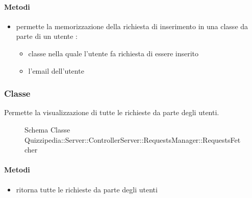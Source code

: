 \paragraph{Metodi}
\begin{itemize}
\item {}
\newline
permette la memorizzazione della richiesta di inserimento in una classe da parte di un utente
\newline
{} :
\begin{itemize}
\item {}
\newline
classe nella quale l'utente fa richiesta di essere inserito
\item {}
\newline
l'email dell'utente
\end{itemize}
\end{itemize}
\subsubsection{Classe }
Permette la visualizzazione di tutte le richieste da parte degli utenti.
\begin{figure}[H]
\centering
\noindent{}
\caption[Schema Classe RequestsFetcher]{Schema Classe Quizzipedia::Server::ControllerServer::RequestsManager::RequestsFetcher}
\end{figure}
\paragraph{Metodi}
\begin{itemize}
\item {}
\newline
ritorna tutte le richieste da parte degli utenti
\newline
\end{itemize}

